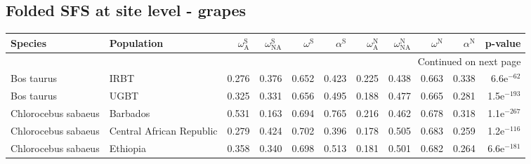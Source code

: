 \subsection{Folded SFS at site level - grapes} 
\begin{longtable}{llrrrrrrrrr}
\toprule
             Species &                Population & $\omega_{\textrm{A}}^{\textrm{S}}$ & $\omega_{\textrm{NA}}^{\textrm{S}}$ & $\omega^{\textrm{S}}$ & $\alpha^{\textrm{S}}$ & $\omega_{\textrm{A}}^{\textrm{N}}$ & $\omega_{\textrm{NA}}^{\textrm{N}}$ & $\omega^{\textrm{N}}$ & $\alpha^{\textrm{N}}$ &       p-value \\
\midrule
\endhead
\midrule
\multicolumn{11}{r}{{Continued on next page}} \\
\midrule
\endfoot

\bottomrule
\endlastfoot
          Bos taurus &                      IRBT &                              0.276 &                               0.376 &                 0.652 &                 0.423 &                              0.225 &                               0.438 &                 0.663 &                 0.338 &  6.6e$^{-62}$ \\
          Bos taurus &                      UGBT &                              0.325 &                               0.331 &                 0.656 &                 0.495 &                              0.188 &                               0.477 &                 0.665 &                 0.281 & 1.5e$^{-193}$ \\
 Chlorocebus sabaeus &                  Barbados &                              0.531 &                               0.163 &                 0.694 &                 0.765 &                              0.216 &                               0.462 &                 0.678 &                 0.318 & 1.1e$^{-267}$ \\
 Chlorocebus sabaeus &  Central African Republic &                              0.279 &                               0.424 &                 0.702 &                 0.396 &                              0.178 &                               0.505 &                 0.683 &                 0.259 & 1.2e$^{-116}$ \\
 Chlorocebus sabaeus &                  Ethiopia &                              0.358 &                               0.340 &                 0.698 &                 0.513 &                              0.181 &                               0.501 &                 0.682 &                 0.264 & 6.6e$^{-181}$ \\

\end{longtable}
